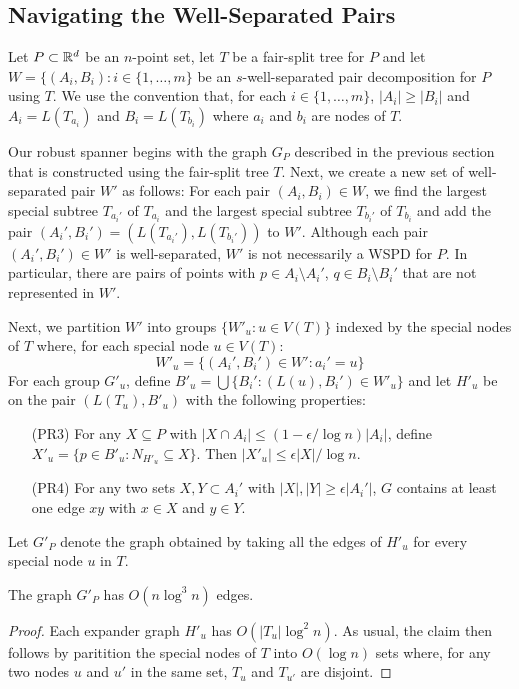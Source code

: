 \documentclass{patmorin}
\begin{document}
\subsection{Navigating the Well-Separated Pairs}

Let $P\subset\mathbb{R}^d$ be an $n$-point set, let $T$ be a fair-split tree for
$P$ and let $W=\{(A_i,B_i):i\in\{1,\ldots,m\}$ be an $s$-well-separated
pair decomposition for $P$ using $T$. We use the convention that,
for each $i\in\{1,\ldots,m\}$, $|A_i|\ge |B_i|$ and $A_i=L(T_{a_i})$
and $B_i=L(T_{b_i})$ where $a_i$ and $b_i$ are nodes of $T$.

Our robust spanner begins with the graph $G_P$ described in the previous
section that is constructed using the fair-split tree $T$.  Next,
we create a new set of well-separated pair $W'$ as follows:  For each
pair $(A_i,B_i)\in W$, we find the largest special subtree $T_{a_i'}$
of $T_{a_i}$ and the largest special subtree $T_{b_i'}$ of $T_{b_i}$
and add the pair $(A_i',B_i')=(L(T_{a_i'}),L(T_{b_i'}))$ to $W'$.
Although each pair $(A_i',B_i')\in W'$ is well-separated, $W'$ is not
necessarily a WSPD for $P$.  In particular, there are pairs of points
with $p\in A_i\setminus A_i'$, $q\in B_i\setminus B_i'$ that are not
represented in $W'$.

Next, we partition $W'$ into groups $\{W'_u: u\in V(T)\}$ indexed by
the special nodes of $T$ where, for each special node $u\in V(T)$:
\[
	W'_u = \{ (A_i',B_i')\in W' : a_i' = u \}
\]
For each group $G'_u$, define $B'_u=\bigcup\{B_i' : (L(u),B_i')\in
W'_u\}$ and let $H'_u$ be on the pair $(L(T_u), B'_u)$ with the following
properties: 
\begin{enumerate}
  \item[(PR3)] For any $X\subseteq P$ with $|X\cap A_i|\le
  (1-\epsilon/\log n)|A_i|$, define $X'_u = \{p\in B'_u: N_{H'_u}\subseteq
  X\}$.  Then $|X'_u|\le \epsilon|X|/\log n$.

  \item[(PR4)] For any two sets $X,Y\subset A_i'$ with $|X|,|Y|\ge
  \epsilon|A_i'|$, $G$ contains at least one edge $xy$ with $x\in X$
  and $y\in Y$.
\end{enumerate}

Let $G'_P$ denote the graph obtained by taking all the edges of $H'_u$ for every special node $u$ in $T$.

\begin{clm}
  The graph $G'_P$ has $O(n\log^3 n)$ edges.
\end{clm}

\begin{proof}
  Each expander graph $H'_u$ has $O(|T_u|\log^2 n)$.  As usual, the claim
  then follows by paritition the special nodes of $T$ into $O(\log n)$
  sets where, for any two nodes $u$ and $u'$ in the same set, $T_u$ and
  $T_{u'}$ are disjoint.
\end{proof}
\end{document}
